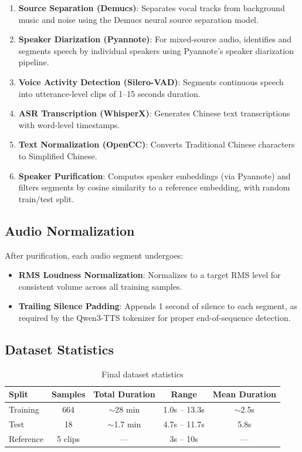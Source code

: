 \documentclass{ar-1col}
\begin{document}
\begin{enumerate}
    \item \textbf{Source Separation (Demucs)}: Separates vocal tracks from background music and noise using the Demucs neural source separation model.
    \item \textbf{Speaker Diarization (Pyannote)}: For mixed-source audio, identifies and segments speech by individual speakers using Pyannote's speaker diarization pipeline.
    \item \textbf{Voice Activity Detection (Silero-VAD)}: Segments continuous speech into utterance-level clips of 1--15 seconds duration.
    \item \textbf{ASR Transcription (WhisperX)}: Generates Chinese text transcriptions with word-level timestamps.
    \item \textbf{Text Normalization (OpenCC)}: Converts Traditional Chinese characters to Simplified Chinese.
    \item \textbf{Speaker Purification}: Computes speaker embeddings (via Pyannote) and filters segments by cosine similarity to a reference embedding, with random train/test split.
\end{enumerate}

\subsection{Audio Normalization}

After purification, each audio segment undergoes:
\begin{itemize}
    \item \textbf{RMS Loudness Normalization}: Normalizes to a target RMS level for consistent volume across all training samples.
    \item \textbf{Trailing Silence Padding}: Appends 1 second of silence to each segment, as required by the Qwen3-TTS tokenizer for proper end-of-sequence detection.
\end{itemize}

\subsection{Dataset Statistics}

\begin{table}[H]
\caption{Final dataset statistics}
\label{tab:dataset}
\begin{center}
\begin{tabular}{@{}lcccc@{}}
\toprule
\textbf{Split} & \textbf{Samples} & \textbf{Total Duration} & \textbf{Range} & \textbf{Mean Duration} \\
\midrule
Training & 664 & $\sim$28 min & 1.0s -- 13.3s & $\sim$2.5s \\
Test & 18 & $\sim$1.7 min & 4.7s -- 11.7s & 5.8s \\
Reference & 5 clips & --- & 3s -- 10s & --- \\
\bottomrule
\end{tabular}
\end{center}
\end{table}
\end{document}
